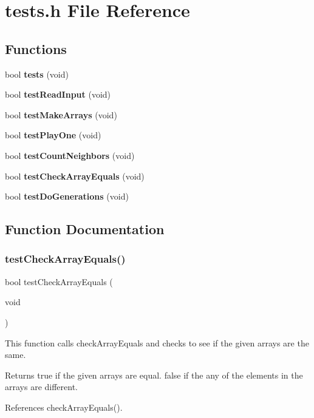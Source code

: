 \section{tests.\+h File Reference}
\label{tests_8h}
\subsection*{Functions}
\begin{DoxyCompactItemize}
\item 
bool \textbf{ tests} (void)
\item 
bool \textbf{ test\+Read\+Input} (void)
\item 
bool \textbf{ test\+Make\+Arrays} (void)
\item 
bool \textbf{ test\+Play\+One} (void)
\item 
bool \textbf{ test\+Count\+Neighbors} (void)
\item 
bool \textbf{ test\+Check\+Array\+Equals} (void)
\item 
bool \textbf{ test\+Do\+Generations} (void)
\end{DoxyCompactItemize}


\subsection{Function Documentation}
\mbox{\label{tests_8h_adc68b5779bf3ba3a99ee3a9eb8d86935}} 
\subsubsection{test\+Check\+Array\+Equals()}
{\footnotesize\ttfamily bool test\+Check\+Array\+Equals (\begin{DoxyParamCaption}\item[{void}]{ }\end{DoxyParamCaption})}

This function calls check\+Array\+Equals and checks to see if the given arrays are the same.

\begin{DoxyReturn}{Returns}
true if the given arrays are equal. false if the any of the elements in the arrays are different. 
\end{DoxyReturn}


References check\+Array\+Equals().



